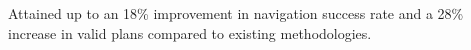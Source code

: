 \begin{cventries}
{\begin{cvitems}
{      }
      \item {Attained up to an 18\% improvement in navigation success rate and a 28\% increase in valid plans compared to existing methodologies.}
    \end{cvitems}
    }
\end{cventries}









